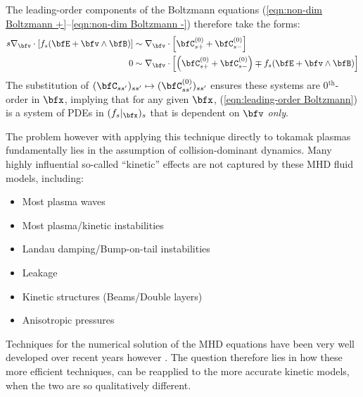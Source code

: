     The leading-order components of the Boltzmann equations (\ref{eqn:non-dim Boltzmann +}–\ref{eqn:non-dim Boltzmann -}) therefore take the forms:
    \begin{align}
        s \nabla_{\bfv}\cdot[f_{s}(\bfE + \bfv\wedge\bfB)]  &\sim  \nabla_{\bfv}\cdot\left[\bfC_{s+}^{(0)} + \bfC_{s-}^{(0)}\right]  \\
        0  &\sim  \nabla_{\bfv}\cdot\left[\left(\bfC_{s+}^{(0)} + \bfC_{s-}^{(0)}\right) \mp f_{s}(\bfE + \bfv\wedge\bfB)\right]  \label{eqn:leading-order Boltzmann}
    \end{align}
    The substitution of $(\bfC_{ss'})_{ss'}  \mapsto  (\bfC_{ss'}^{(0)})_{ss'}$ ensures these systems are 0$^{\text{th}}$-order in $\bfx$, implying that for any given $\bfx$, (\ref{eqn:leading-order Boltzmann}) is a system of PDEs in $(f_{s}|_{\bfx})_{s}$ that is dependent on $\bfv$ \emph{only}.
    
    The problem however with applying this technique directly to tokamak plasmas fundamentally lies in the assumption of collision-dominant dynamics.  Many highly influential so-called ``kinetic'' effects are not captured by these MHD fluid models, including: 
    \begin{itemize}
        \item  Most plasma waves
        \item  Most plasma/kinetic instabilities
        \item  Landau damping/Bump-on-tail instabilities
        \item  Leakage
        \item  Kinetic structures (Beams/Double layers)
        \item  Anisotropic pressures
    \end{itemize}
    Techniques for the numerical solution of the MHD equations have been very well developed over recent years however . The question therefore lies in how these more efficient techniques, can be reapplied to the more accurate kinetic models, when the two are so qualitatively different.

    
